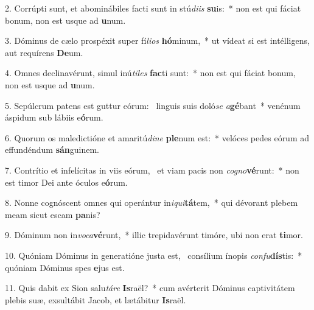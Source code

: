 2. Corrúpti sunt, et abominábiles facti sunt in stú\textit{di}\textit{is} \textbf{su}is:~*  non est qui fáciat bonum, non est usque ad \textbf{u}num.\

3. Dóminus de cælo prospéxit super fí\textit{li}\textit{os} \textbf{hó}minum,~*  ut vídeat si est intélligens, aut requírens \textbf{De}um.\

4. Omnes declinavérunt, simul inú\textit{ti}\textit{les} \textbf{fac}ti sunt:~*  non est qui fáciat bonum, non est usque ad \textbf{u}num.\

5. Sepúlcrum patens est guttur eórum: \dag\  linguis suis doló\textit{se} \textit{a}\textbf{gé}bant~*  venénum áspidum sub lábiis e\textbf{ó}rum.\

6. Quorum os maledictióne et amaritú\textit{di}\textit{ne} \textbf{ple}num est:~*  velóces pedes eórum ad effundéndum \textbf{sán}guinem.\

7. Contrítio et infelícitas in viis eórum, \dag\  et viam pacis non \textit{co}\textit{gno}\textbf{vé}runt:~*  non est timor Dei ante óculos e\textbf{ó}rum.\

8. Nonne cognóscent omnes qui operántur in\textit{i}\textit{qui}\textbf{tá}tem,~*  qui dévorant plebem meam sicut escam \textbf{pa}nis?\

9. Dóminum non in\textit{vo}\textit{ca}\textbf{vé}runt,~*  illic trepidavérunt timóre, ubi non erat \textbf{ti}mor.\

10. Quóniam Dóminus in generatióne justa est, \dag\  consílium ínopis \textit{con}\textit{fu}\textbf{dís}tis:~*  quóniam Dóminus spes \textbf{e}jus est.\

11. Quis dabit ex Sion salu\textit{tá}\textit{re} \textbf{Is}raël?~*  cum avérterit Dóminus captivitátem plebis suæ, exsultábit Jacob, et lætábitur \textbf{Is}raël.\

